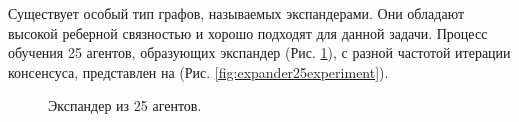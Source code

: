 \documentclass[a4paper,article,14pt]{extarticle}
\begin{document}
Существует особый тип графов, называемых экспандерами. Они обладают высокой реберной связностью и хорошо подходят для данной задачи. Процесс обучения 25 агентов, образующих экспандер (Рис. \ref{fig:expander25}), с разной частотой итерации консенсуса, представлен на (Рис. \ref{fig:expander25experiment}).

\begin{figure}[H]
\begin{center}
\caption{ \label{fig:expander25}
     Экспандер из 25 агентов.}
\end{center}
\end{figure}
\end{document}
